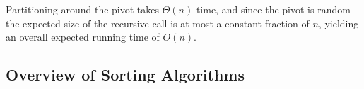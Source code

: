 Partitioning around the pivot takes $\Theta(n)$ time, and since the pivot is random the expected size of the recursive call is at most a constant fraction of $n$, yielding an overall expected running time of $O(n)$.

\subsection{Overview of Sorting Algorithms}




\newcommand{\mixcolor}{70}



